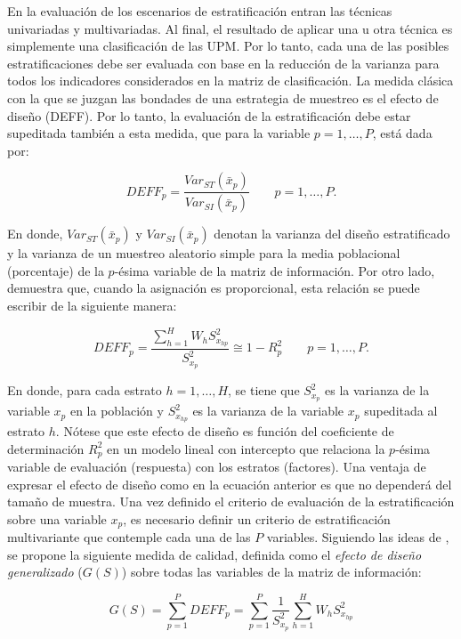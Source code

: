 \documentclass[
  12pt,
]{book}
\begin{document}
En la evaluación de los escenarios de estratificación entran las técnicas univariadas y multivariadas. Al final, el resultado de aplicar una u otra técnica es simplemente una clasificación de las UPM. Por lo tanto, cada una de las posibles estratificaciones debe ser evaluada con base en la reducción de la varianza para todos los indicadores considerados en la matriz de clasificación. La medida clásica con la que se juzgan las bondades de una estrategia de muestreo es el efecto de diseño (DEFF). Por lo tanto, la evaluación de la estratificación debe estar supeditada también a esta medida, que para la variable \(p = 1, \ldots, P\), está dada por:

\[
DEFF_p = \frac{Var_{ST}(\bar x _p)}{Var_{SI}(\bar x _p)} \ \ \ \ \ \ \ \ \ p = 1, \ldots, P.
\]

En donde, \(Var_{ST}(\bar x _p)\) y \(Var_{SI}(\bar x _p)\) denotan la varianza del diseño estratificado y la varianza de un muestreo aleatorio simple para la media poblacional (porcentaje) de la \(p\)-ésima variable de la matriz de información. Por otro lado, \citet[página 184]{Gutierrez_2016} demuestra que, cuando la asignación es proporcional, esta relación se puede escribir de la siguiente manera:

\[
DEFF_p = \frac{ \sum_{h=1}^H W_h S^2_{x_{hp}} }{S^2_{x_p}} \cong 1 - R^2_p \ \ \ \ \ \ \ \ \ p = 1, \ldots, P.
\]

En donde, para cada estrato \(h = 1, \ldots, H\), se tiene que \(S^2_{x_p}\) es la varianza de la variable \(x_p\) en la población y \(S^2_{x_{hp}}\) es la varianza de la variable \(x_p\) supeditada al estrato \(h\). Nótese que este efecto de diseño es función del coeficiente de determinación \(R^2_p\) en un modelo lineal con intercepto que relaciona la \(p\)-ésima variable de evaluación (respuesta) con los estratos (factores). Una ventaja de expresar el efecto de diseño como en la ecuación anterior es que no dependerá del tamaño de muestra. Una vez definido el criterio de evaluación de la estratificación sobre una variable \(x_p\), es necesario definir un criterio de estratificación multivariante que contemple cada una de las \(P\) variables. Siguiendo las ideas de \citet{Jarque_1981}, se propone la siguiente medida de calidad, definida como el \emph{efecto de diseño generalizado} (\(G(S)\)) sobre todas las variables de la matriz de información:

\[
G(S) = \sum_{p=1}^P DEFF_p = \sum_{p=1}^P \frac{1}{S^2_{x_p}}\sum_{h=1}^H W_h S^2_{x_{hp}}
\]
\end{document}
